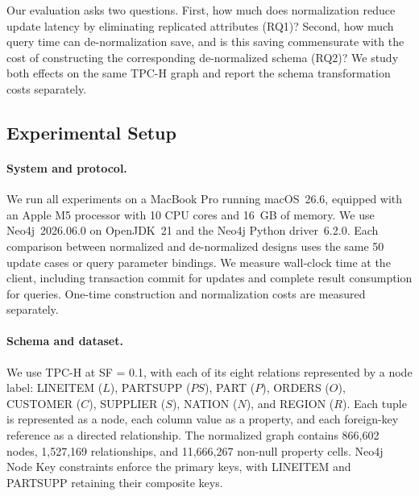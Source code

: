\documentclass[sigconf]{acmart}
\begin{document}
Our evaluation asks two questions. First, how much does normalization reduce
update latency by eliminating replicated attributes (RQ1)? Second, how much query
time can de-normalization save, and is this saving commensurate with the cost
of constructing the corresponding de-normalized schema (RQ2)? We study both effects
on the same TPC-H graph and report the schema transformation costs separately.

\subsection{Experimental Setup}

\paragraph{System and protocol.}
We run all experiments on a MacBook Pro running macOS~26.6, equipped with an
Apple M5 processor with 10 CPU cores and 16~GB of memory. We use
Neo4j~2026.06.0 on OpenJDK~21 and the Neo4j Python driver~6.2.0. Each
comparison between normalized and de-normalized designs uses the same 50
update cases or query parameter bindings. We measure wall-clock time at the
client, including transaction commit for updates and complete result
consumption for queries. One-time construction and normalization costs are
measured separately.

\paragraph{Schema and dataset.}
We use TPC-H at SF = 0.1, with each of its eight relations represented by a
node label: \textsf{LINEITEM} ($L$), \textsf{PARTSUPP} ($PS$),
\textsf{PART} ($P$), \textsf{ORDERS} ($O$), \textsf{CUSTOMER} ($C$),
\textsf{SUPPLIER} ($S$), \textsf{NATION} ($N$), and \textsf{REGION} ($R$).
Each tuple is represented as a node, each column value as a property, and each
foreign-key reference as a directed relationship. The normalized graph contains
866,602 nodes, 1,527,169 relationships, and 11,666,267 non-null property cells.
Neo4j Node Key constraints enforce the primary keys, with \textsf{LINEITEM} and
\textsf{PARTSUPP} retaining their composite keys.
\end{document}
